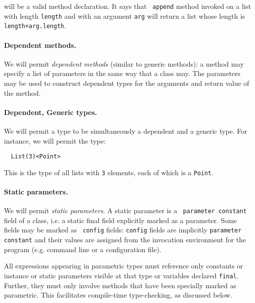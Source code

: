 \documentclass{article}
\begin{document}
\noindent will be a valid method declaration. It says that {\tt
append} method invoked on a list with length {\tt length} and with an
argument {\tt arg} will return a list whose length is {\tt
length+arg.length}.

\paragraph{Dependent methods.}
We will permit {\em dependent methods} (similar to generic methods): a
method may specify a list of parameters in the same way that a class
may. The parameters may be used to construct dependent types for the
arguments and return value of the method.

\paragraph{Dependent, Generic types.}
We will permit a type to be simultaneously a dependent and a generic type.
For instance, we will permit the type:
{\footnotesize
\begin{verbatim}
  List(3)<Point>  
\end{verbatim}}
\noindent This is the type of all lists with {\tt 3} elements, each of
which is a {\tt Point}.

\paragraph{Static parameters.}
We will permit {\em static parameters}. A static parameter is a {\tt
parameter constant} field of a class, i.e.{} a static final field
explicitly marked as a parameter. Some fields may be marked as {\tt
config} fields: {\tt config} fields are implicitly {\tt parameter
constant} and their values are assigned from the invocation
environment for the program (e.g.{} command line or a configuration
file).

All expressions appearing in parametric types must reference only
constants or instance or static parameters visible at that type or
variables declared {\tt final}. Further, they must only involve
methods that have been specially marked as parametric. This
facilitates compile-time type-checking, as discussed below.

\end{document}
